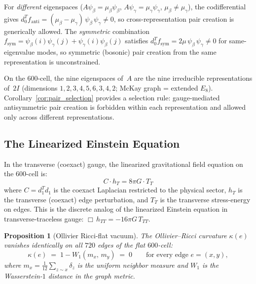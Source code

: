\documentclass[12pt,a4paper]{article}
\newtheorem{proposition}{Proposition}
\theoremstyle{definition}
\begin{document}
For \emph{different} eigenspaces ($A\psi_\beta = \mu_\beta \psi_\beta$, $A\psi_\gamma = \mu_\gamma \psi_\gamma$, $\mu_\beta \neq \mu_\gamma$), the codifferential gives $d_0^T f_{\mathrm{anti}} = (\mu_\beta - \mu_\gamma)\,\psi_\beta\,\psi_\gamma \neq 0$, so cross-representation pair creation is generically allowed. The \emph{symmetric} combination $f_{\mathrm{sym}} = \psi_\beta(i)\psi_\gamma(j) + \psi_\gamma(i)\psi_\beta(j)$ satisfies $d_0^T f_{\mathrm{sym}} = 2\mu\,\psi_\beta\,\psi_\gamma \neq 0$ for same-eigenvalue modes, so symmetric (bosonic) pair creation from the same representation is unconstrained.

On the 600-cell, the nine eigenspaces of~$A$ are the nine irreducible representations of~$2I$ (dimensions $1, 2, 3, 4, 5, 6, 3, 4, 2$; McKay graph = extended $E_8$). Corollary~\ref{cor:pair_selection} provides a selection rule: gauge-mediated antisymmetric pair creation is forbidden within each representation and allowed only across different representations.

\subsection{The Linearized Einstein Equation}

In the transverse (coexact) gauge, the linearized gravitational field equation on the 600-cell is:
\begin{equation}
\boxed{C \cdot h_T = 8\pi G \cdot T_T}
\label{eq:gravity}
\end{equation}
where $C = d_1^T d_1$ is the coexact Laplacian restricted to the physical sector, $h_T$ is the transverse (coexact) edge perturbation, and $T_T$ is the transverse stress-energy on edges. This is the discrete analog of the linearized Einstein equation in transverse-traceless gauge: $\Box\, h_{TT} = -16\pi G\, T_{TT}$.

\begin{proposition}[Ollivier Ricci-flat vacuum]
\label{prop:ricci_flat}
The Ollivier--Ricci curvature $\kappa(e)$ vanishes identically on all\/ $720$ edges of the flat $600$-cell:
\begin{equation}
\kappa(e) \;=\; 1 - W_1(m_x,\, m_y) \;=\; 0 \qquad \text{for every edge } e = (x,y),
\label{eq:ollivier_flat}
\end{equation}
where $m_x = \frac{1}{12}\sum_{z \sim x}\delta_z$ is the uniform neighbor measure and\/ $W_1$ is the Wasserstein-$1$ distance in the graph metric.
\end{proposition}
\end{document}

